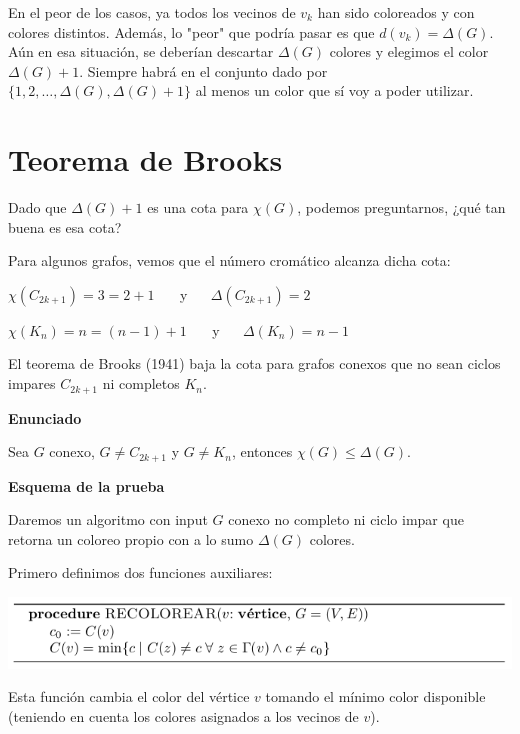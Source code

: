 \documentclass[10pt,a4paper]{article}
\begin{document}
En el peor de los casos, ya todos los vecinos de $v_k$ han sido coloreados y con colores distintos. Además, lo "peor" que podría pasar es que $d(v_k)= \Delta(G)$. Aún en esa situación, se deberían descartar $\Delta(G)$ colores y elegimos el color $\Delta(G) + 1$. Siempre habrá en el conjunto dado por $\{1, 2, \dots, \Delta(G), \Delta(G) + 1\}$ al menos un color que sí voy a poder utilizar.

\section*{Teorema de Brooks}

Dado que $\Delta(G) + 1$ es una cota para $\chi(G)$, podemos preguntarnos, ¿qué tan buena es esa cota?

Para algunos grafos, vemos que el número cromático alcanza dicha cota:

\begin{center}
$\chi(C_{2k+1}) = 3 = 2 + 1$    y    $\Delta(C_{2k+1}) = 2$
\end{center}

\begin{center}
$\chi(K_n) = n = (n-1) + 1$    y    $\Delta(K_n) = n - 1$
\end{center}

El teorema de Brooks (1941) baja la cota para grafos conexos que no sean ciclos impares $C_{2k+1}$ ni completos $K_n$.

\textbf{Enunciado}

Sea $G$ conexo, $G\neq C_{2k+1}$ y $G\neq K_n$, entonces $\chi(G) \leq \Delta(G)$.

\textbf{Esquema de la prueba}

Daremos un algoritmo con input $G$ conexo no completo ni ciclo impar que retorna un coloreo propio con a lo sumo $\Delta(G)$ colores.

Primero definimos dos funciones auxiliares:


    \begin{adjustbox}{max size={\textwidth}{\textheight}}
        \includegraphics{definitions/algo_recolorear.png}
        \end{adjustbox}
    

Esta función cambia el color del vértice $v$ tomando el mínimo color disponible (teniendo en cuenta los colores asignados a los vecinos de $v$).
\end{document}

